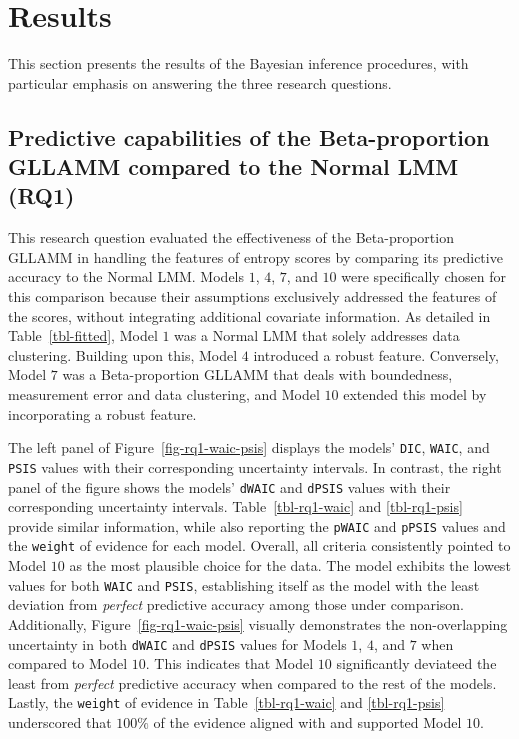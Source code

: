 \documentclass[
  authoryear,
  preprint,
  1p]{elsarticle}
\begin{document}
\section{Results}\label{sec-results}

This section presents the results of the Bayesian inference procedures,
with particular emphasis on answering the three research questions.

\subsection{Predictive capabilities of the Beta-proportion GLLAMM
compared to the Normal LMM (RQ1)}\label{sec-R-RQ1}

This research question evaluated the effectiveness of the
Beta-proportion GLLAMM in handling the features of entropy scores by
comparing its predictive accuracy to the Normal LMM. Models \(1\),
\(4\), \(7\), and \(10\) were specifically chosen for this comparison
because their assumptions exclusively addressed the features of the
scores, without integrating additional covariate information. As
detailed in Table~\ref{tbl-fitted}, Model \(1\) was a Normal LMM that
solely addresses data clustering. Building upon this, Model \(4\)
introduced a robust feature. Conversely, Model \(7\) was a
Beta-proportion GLLAMM that deals with boundedness, measurement error
and data clustering, and Model \(10\) extended this model by
incorporating a robust feature.

The left panel of Figure~\ref{fig-rq1-waic-psis} displays the models'
\texttt{DIC}, \texttt{WAIC}, and \texttt{PSIS} values with their
corresponding uncertainty intervals. In contrast, the right panel of the
figure shows the models' \texttt{dWAIC} and \texttt{dPSIS} values with
their corresponding uncertainty intervals. Table~\ref{tbl-rq1-waic} and
\ref{tbl-rq1-psis} provide similar information, while also reporting the
\texttt{pWAIC} and \texttt{pPSIS} values and the \texttt{weight} of
evidence for each model. Overall, all criteria consistently pointed to
Model \(10\) as the most plausible choice for the data. The model
exhibits the lowest values for both \texttt{WAIC} and \texttt{PSIS},
establishing itself as the model with the least deviation from
\emph{perfect} predictive accuracy among those under comparison.
Additionally, Figure~\ref{fig-rq1-waic-psis} visually demonstrates the
non-overlapping uncertainty in both \texttt{dWAIC} and \texttt{dPSIS}
values for Models \(1\), \(4\), and \(7\) when compared to Model \(10\).
This indicates that Model \(10\) significantly deviateed the least from
\emph{perfect} predictive accuracy when compared to the rest of the
models. Lastly, the \texttt{weight} of evidence in
Table~\ref{tbl-rq1-waic} and \ref{tbl-rq1-psis} underscored that
\(100\%\) of the evidence aligned with and supported Model \(10\).
\end{document}
